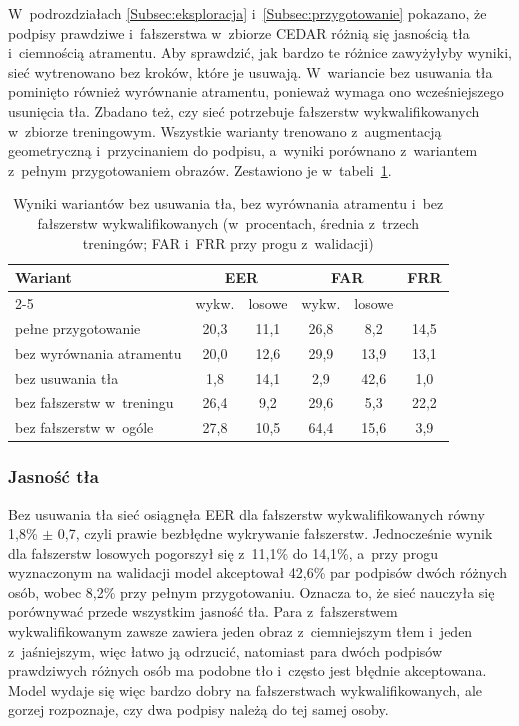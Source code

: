 \documentclass[12pt, twoside, openright]{article}
\begin{document}
W~podrozdziałach \ref{Subsec:eksploracja} i~\ref{Subsec:przygotowanie} pokazano, że podpisy prawdziwe i~fałszerstwa w~zbiorze CEDAR różnią się jasnością tła i~ciemnością atramentu.
Aby sprawdzić, jak bardzo te różnice zawyżyłyby wyniki, sieć wytrenowano bez kroków, które je usuwają.
W~wariancie bez usuwania tła pominięto również wyrównanie atramentu, ponieważ wymaga ono wcześniejszego usunięcia tła.
Zbadano też, czy sieć potrzebuje fałszerstw wykwalifikowanych w~zbiorze treningowym.
Wszystkie warianty trenowano z~augmentacją geometryczną i~przycinaniem do podpisu, a~wyniki porównano z~wariantem z~pełnym przygotowaniem obrazów.
Zestawiono je w~tabeli~\ref{Tab:wycieki}.

\begin{table}[ht]
\caption{Wyniki wariantów bez usuwania tła, bez wyrównania atramentu i~bez fałszerstw wykwalifikowanych (w~procentach, średnia z~trzech treningów; FAR i~FRR przy progu z~walidacji)}
\centering
	\begin{tabular}{|l|c|c|c|c|c|}
		\hline
		\multirow{2}{*}{Wariant} & \multicolumn{2}{c|}{EER} & \multicolumn{2}{c|}{FAR} & \multirow{2}{*}{FRR} \\
		\cline{2-5}
		& wykw. & losowe & wykw. & losowe & \\
		\hline
		pełne przygotowanie & 20,3 & 11,1 & 26,8 & 8,2 & 14,5 \\
		bez wyrównania atramentu & 20,0 & 12,6 & 29,9 & 13,9 & 13,1 \\
		bez usuwania tła & 1,8 & 14,1 & 2,9 & 42,6 & 1,0 \\
		\hline
		bez fałszerstw w~treningu & 26,4 & 9,2 & 29,6 & 5,3 & 22,2 \\
		bez fałszerstw w~ogóle & 27,8 & 10,5 & 64,4 & 15,6 & 3,9 \\
		\hline
	\end{tabular}
\label{Tab:wycieki}
\end{table}

\subsubsection*{Jasność tła}

Bez usuwania tła sieć osiągnęła EER dla fałszerstw wykwalifikowanych równy 1,8\% $\pm$ 0,7, czyli prawie bezbłędne wykrywanie fałszerstw.
Jednocześnie wynik dla fałszerstw losowych pogorszył się z~11,1\% do 14,1\%, a~przy progu wyznaczonym na walidacji model akceptował 42,6\% par podpisów dwóch różnych osób, wobec 8,2\% przy pełnym przygotowaniu.
Oznacza to, że sieć nauczyła się porównywać przede wszystkim jasność tła.
Para z~fałszerstwem wykwalifikowanym zawsze zawiera jeden obraz z~ciemniejszym tłem i~jeden z~jaśniejszym, więc łatwo ją odrzucić, natomiast para dwóch podpisów prawdziwych różnych osób ma podobne tło i~często jest błędnie akceptowana.
Model wydaje się więc bardzo dobry na fałszerstwach wykwalifikowanych, ale gorzej rozpoznaje, czy dwa podpisy należą do tej samej osoby.
\end{document}
